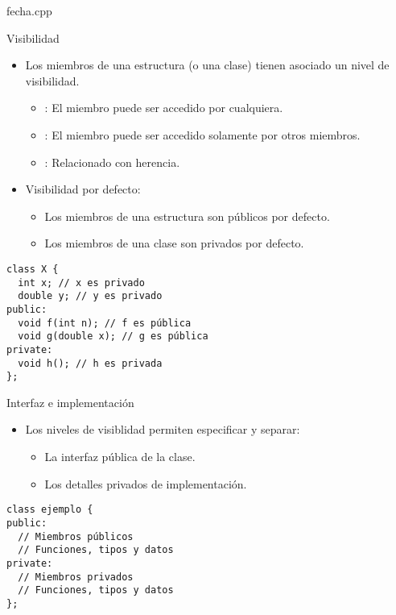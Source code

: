 \begin{frame}
\begin{block}{fecha.cpp}
\mode<presentation>{

}
\end{block}
\end{frame}

\begin{frame}[t,fragile]{Visibilidad}
\vspace{-0.25cm}
\begin{itemize}
  \item Los miembros de una estructura (o una clase) tienen asociado un nivel de visibilidad.
    \begin{itemize}
      \item {}: El miembro puede ser accedido por cualquiera.
      \item {}: El miembro puede ser accedido solamente por otros miembros.
      \item {}: Relacionado con herencia.
    \end{itemize}
  \item Visibilidad por defecto:
    \begin{itemize}
      \item Los miembros de una estructura son públicos por defecto.
      \item Los miembros de una clase son privados por defecto.
    \end{itemize}
\end{itemize}
\vspace{-0.25cm}
\begin{lstlisting}
class X {
  int x; // x es privado
  double y; // y es privado
public:
  void f(int n); // f es pública
  void g(double x); // g es pública
private:
  void h(); // h es privada
};
\end{lstlisting}
\end{frame}

\begin{frame}[fragile]{Interfaz e implementación}
\begin{itemize}
  \item Los niveles de visiblidad permiten especificar y separar:
    \begin{itemize}
      \item La interfaz pública de la clase.
      \item Los detalles privados de implementación.
    \end{itemize}
\end{itemize}
\begin{lstlisting}
class ejemplo {
public:
  // Miembros públicos
  // Funciones, tipos y datos
private:
  // Miembros privados
  // Funciones, tipos y datos
};
\end{lstlisting}
\end{frame}


